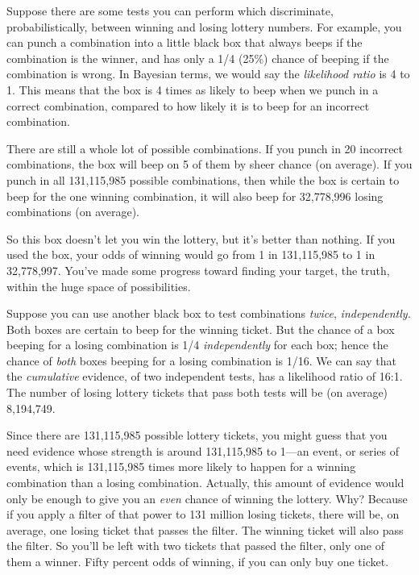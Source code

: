 {
 Suppose there are some tests you can perform which discriminate,
probabilistically, between winning and losing lottery numbers. For
example, you can punch a combination into a little black box that
always beeps if the combination is the winner, and has only a 1/4
(25\%) chance of beeping if the combination is wrong. In Bayesian
terms, we would say the \textit{likelihood ratio} is 4 to 1. This means
that the box is 4 times as likely to beep when we punch in a correct
combination, compared to how likely it is to beep for an incorrect
combination.}

{
 There are still a whole lot of possible combinations. If you punch
in 20 incorrect combinations, the box will beep on 5 of them by sheer
chance (on average). If you punch in all 131,115,985 possible
combinations, then while the box is certain to beep for the one winning
combination, it will also beep for 32,778,996 losing combinations (on
average).}

{
 So this box doesn't let you win the lottery, but
it's better than nothing. If you used the box, your
odds of winning would go from 1 in 131,115,985 to 1 in 32,778,997.
You've made some progress toward finding your target,
the truth, within the huge space of possibilities.}

{
 Suppose you can use another black box to test combinations
\textit{twice}, \textit{independently.} Both boxes are certain to beep
for the winning ticket. But the chance of a box beeping for a losing
combination is 1/4 \textit{independently} for each box; hence the
chance of \textit{both} boxes beeping for a losing combination is 1/16.
We can say that the \textit{cumulative} evidence, of two independent
tests, has a likelihood ratio of 16:1. The number of losing lottery
tickets that pass both tests will be (on average) 8,194,749.}

{
 Since there are 131,115,985 possible lottery tickets, you might
guess that you need evidence whose strength is around 131,115,985 to
1---an event, or series of events, which is 131,115,985 times more
likely to happen for a winning combination than a losing combination.
Actually, this amount of evidence would only be enough to give you an
\textit{even} chance of winning the lottery. Why? Because if you apply
a filter of that power to 131 million losing tickets, there will be, on
average, one losing ticket that passes the filter. The winning ticket
will also pass the filter. So you'll be left with two
tickets that passed the filter, only one of them a winner. Fifty
percent odds of winning, if you can only buy one ticket.}

